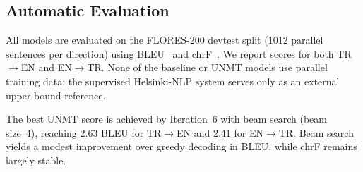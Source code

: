 \documentclass[runningheads]{llncs}
\begin{document}
\subsection{Automatic Evaluation}

All models are evaluated on the FLORES-200 devtest split (1012 parallel sentences per direction) using BLEU~\cite{papineni2002bleu} and chrF~\cite{popovic2015chrf}. We report scores for both TR$\rightarrow$EN and EN$\rightarrow$TR. None of the baseline or UNMT models use parallel training data; the supervised Helsinki-NLP system serves only as an external upper-bound reference.

The best UNMT score is achieved by Iteration~6 with beam search (beam size~4), reaching 2.63 BLEU for TR$\rightarrow$EN and 2.41 for EN$\rightarrow$TR. Beam search yields a modest improvement over greedy decoding in BLEU, while chrF remains largely stable.

\begin{table}[t]
\centering
\caption{Final automatic evaluation results on FLORES-200 devtest.}
\label{tab:final-results}
\end{table}
\end{document}
